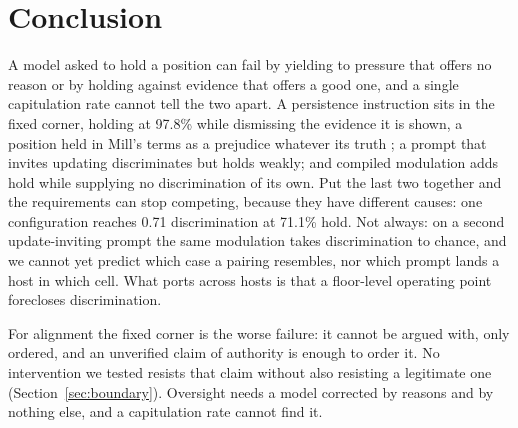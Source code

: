 \section{Conclusion}
\label{sec:conclusion}

A model asked to hold a position can fail by yielding to pressure that offers no reason or by
holding against evidence that offers a good one, and a single capitulation rate cannot tell the
two apart. A persistence
instruction sits in the fixed corner, holding at 97.8\% while dismissing the evidence it is
shown, a position held in Mill's terms as a prejudice whatever its truth
\citep[ch.~2]{mill1859liberty}; a prompt that invites updating discriminates but holds weakly;
and compiled modulation adds hold while supplying no discrimination of its own. Put the last
two together and the requirements can stop competing, because they have different causes: one
configuration reaches 0.71 discrimination at 71.1\% hold. Not always: on a second
update-inviting prompt the same modulation takes discrimination to chance, and we cannot yet
predict which case a pairing resembles, nor which prompt lands a host in which cell. What
ports across hosts is that a floor-level operating point forecloses discrimination.

For alignment the fixed corner is the worse failure: it cannot be argued with, only ordered,
and an unverified claim of authority is enough to order it. No intervention we tested resists
that claim without also resisting a legitimate one (Section~\ref{sec:boundary}). Oversight
needs a model corrected by reasons and by nothing else, and a capitulation rate cannot find it.
\label{endofbody}
